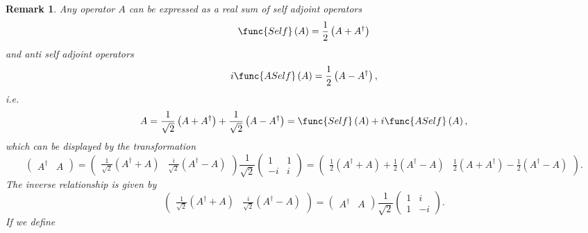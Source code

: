 \documentclass[aps,preprint]{revtex4}
\newtheorem{remark}[theorem]{Remark}
\begin{document}
\begin{remark}
Any operator $A$ can be expressed as a real sum of self adjoint operators 
\begin{equation}
\func{Self}\left( A\right) =\frac{1}{2}\left( A+A^{\dagger }\right)
\end{equation}%
and anti self adjoint operators%
\begin{equation}
i\func{ASelf}\left( A\right) =\frac{1}{2}\left( A-A^{\dagger }\right) ,
\end{equation}%
i.e. 
\begin{equation*}
A=\frac{1}{\sqrt{2}}\left( A+A^{\dagger }\right) +\frac{1}{\sqrt{2}}\left(
A-A^{\dagger }\right) =\func{Self}\left( A\right) +i\func{ASelf}\left(
A\right) ,
\end{equation*}%
which can be displayed by the transformation 
\begin{equation}
\left( 
\begin{array}{cc}
A^{\dagger } & A%
\end{array}%
\right) =\left( 
\begin{array}{cc}
\frac{1}{\sqrt{2}}\left( A^{\dagger }+A\right) & \frac{i}{\sqrt{2}}\left(
A^{\dagger }-A\right)%
\end{array}%
\right) \frac{1}{\sqrt{2}}\left( 
\begin{array}{cc}
1 & 1 \\ 
-i & i%
\end{array}%
\right) =\left( 
\begin{array}{cc}
\frac{1}{2}\left( A^{\dagger }+A\right) +\frac{1}{2}\left( A^{\dagger
}-A\right) & \frac{1}{2}\left( A+A^{\dagger }\right) -\frac{1}{2}\left(
A^{\dagger }-A\right)%
\end{array}%
\right) .
\end{equation}%
The inverse relationship is given by 
\begin{equation}
\left( 
\begin{array}{cc}
\frac{1}{\sqrt{2}}\left( A^{\dagger }+A\right) & \frac{i}{\sqrt{2}}\left(
A^{\dagger }-A\right)%
\end{array}%
\right) =\left( 
\begin{array}{cc}
A^{\dagger } & A%
\end{array}%
\right) \frac{1}{\sqrt{2}}\left( 
\begin{array}{cc}
1 & i \\ 
1 & -i%
\end{array}%
\right) .
\end{equation}%
If we define 
\begin{eqnarray}

\end{eqnarray}
\end{remark}
\end{document}
